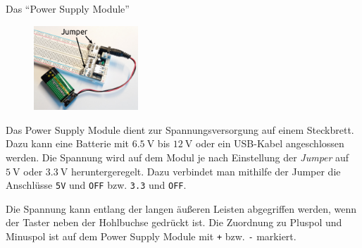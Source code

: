 \bigskip
\begin{zsfg}{Das \enquote{Power Supply Module}}\label{powersupplymodule}
	
	\begin{figure}
		\vspace{-0.5\baselineskip}
		\centering
		\includegraphics[width=0.35\textwidth]{./pics/steckbrett-mit-power-module-klein.png}
		\vspace{-\baselineskip}
	\end{figure}
	Das Power Supply Module dient zur Spannungsversorgung auf einem Steckbrett. Dazu kann eine Batterie mit $\SI{6,5}{\volt}$ bis $\SI{12}{\volt}$ oder ein USB-Kabel angeschlossen werden. Die Spannung wird auf dem Modul je nach Einstellung der \emph{Jumper} auf $\SI{5}{\volt}$ oder $\SI{3,3}{\volt}$ heruntergeregelt. Dazu verbindet man mithilfe der Jumper die Anschlüsse \texttt{5V} und \texttt{OFF} bzw. \texttt{3.3} und \texttt{OFF}.
	
	Die Spannung kann entlang der langen äußeren Leisten abgegriffen werden, wenn der Taster neben der Hohlbuchse gedrückt ist. Die Zuordnung zu Pluspol und Minuspol ist auf dem Power Supply Module mit \texttt{+} bzw. \texttt{-} markiert.
\end{zsfg}


